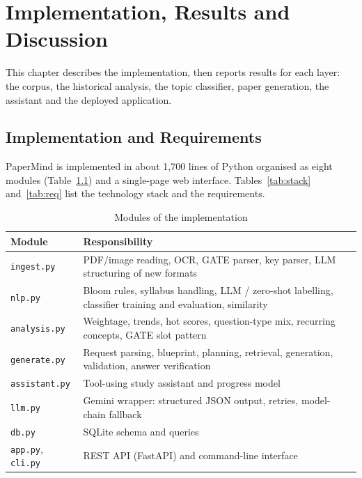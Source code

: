 \chapter{Implementation, Results and Discussion}\label{ch:results}
This chapter describes the implementation, then reports results for each layer: the corpus, the historical analysis,
the topic classifier, paper generation, the assistant and the deployed application.

\section{Implementation and Requirements}
PaperMind is implemented in about 1,700 lines of Python organised as eight modules (Table~\ref{tab:modules}) and a
single-page web interface. Tables~\ref{tab:stack} and~\ref{tab:req} list the technology stack and the requirements.

\begin{table}[h]
\centering
\caption{Modules of the implementation}
\label{tab:modules}
\small
\begin{tabularx}{\textwidth}{@{}lX@{}}
\toprule
\textbf{Module} & \textbf{Responsibility}\\
\midrule
\texttt{ingest.py} & PDF/image reading, OCR, GATE parser, key parser, LLM structuring of new formats\\
\texttt{nlp.py} & Bloom rules, syllabus handling, LLM / zero-shot labelling, classifier training and evaluation, similarity\\
\texttt{analysis.py} & Weightage, trends, hot scores, question-type mix, recurring concepts, GATE slot pattern\\
\texttt{generate.py} & Request parsing, blueprint, planning, retrieval, generation, validation, answer verification\\
\texttt{assistant.py} & Tool-using study assistant and progress model\\
\texttt{llm.py} & Gemini wrapper: structured JSON output, retries, model-chain fallback\\
\texttt{db.py} & SQLite schema and queries\\
\texttt{app.py}, \texttt{cli.py} & REST API (FastAPI) and command-line interface\\
\bottomrule
\end{tabularx}
\end{table}

